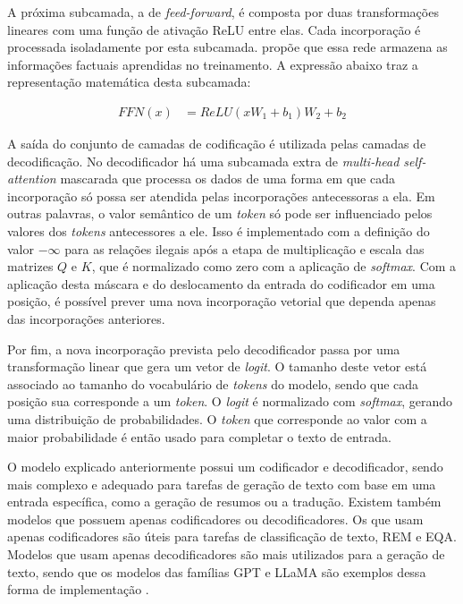 A próxima subcamada, a de \textit{feed-forward}, é composta por duas transformações lineares com uma função de ativação \ac{ReLU} entre elas. Cada incorporação é
processada isoladamente por esta subcamada. \textcite{feed_forward_knowledge} propõe que essa rede armazena as informações factuais aprendidas no treinamento. A
expressão abaixo traz a representação matemática desta subcamada:

\begin{align*}
      FFN(x) & = ReLU(xW_1+b_1)W_2 + b_2
\end{align*}

A saída do conjunto de camadas de codificação é utilizada pelas camadas de decodificação. No decodificador há uma subcamada extra de \textit{multi-head self-attention}
mascarada que processa os dados de uma forma em que cada incorporação só possa ser atendida pelas incorporações antecessoras a ela. Em outras palavras, o valor semântico
de um \textit{token} só pode ser influenciado pelos valores dos \textit{tokens} antecessores a ele. Isso é implementado com a definição do valor
\begin{math}-\infty\end{math} para as relações ilegais após a etapa de multiplicação e escala das matrizes \begin{math}Q\end{math} e \begin{math}K\end{math}, que é
normalizado como zero com a aplicação de \textit{softmax}. Com a aplicação desta máscara e do deslocamento da entrada do codificador em uma posição, é possível prever
uma nova incorporação vetorial que dependa apenas das incorporações anteriores.

Por fim, a nova incorporação prevista pelo decodificador passa por uma transformação linear que gera um vetor de \textit{logit}. O tamanho deste vetor está associado ao
tamanho do vocabulário de \textit{tokens} do modelo, sendo que cada posição sua corresponde a um \textit{token}. O \textit{logit} é normalizado com \textit{softmax},
gerando uma distribuição de probabilidades. O \textit{token} que corresponde ao valor com a maior probabilidade é então usado para completar o texto de entrada.


O modelo explicado anteriormente possui um codificador e decodificador, sendo mais complexo e adequado para tarefas de geração de texto com base em uma entrada específica,
como a geração de resumos ou a tradução. Existem também modelos que possuem apenas codificadores ou decodificadores. Os que usam apenas codificadores são úteis para
tarefas de classificação de texto, \ac{REM} e \ac{EQA}. Modelos que usam apenas decodificadores são mais utilizados para a geração de texto, sendo que os modelos das
famílias \ac{GPT} e \ac{LLaMA} são exemplos dessa forma de implementação \cite{llm_survey_2024}.

